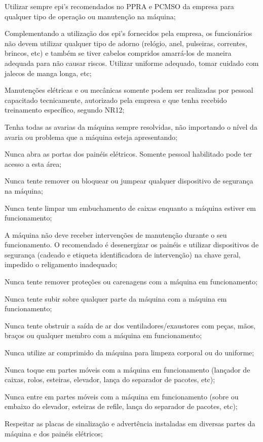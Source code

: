 \begin{generalSafetyRules}
    \item Utilizar sempre epi's recomendados no PPRA e PCMSO da empresa para qualquer tipo de operação ou
manutenção na máquina;
    \item  Complementando a utilização dos epi's fornecidos pela empresa, os funcionários não devem utilizar
qualquer tipo de adorno (relógio, anel, pulseiras, correntes, brincos, etc) e também se tiver cabelos compridos
amarrá-los de maneira adequada para não causar riscos. Utilizar uniforme adequado, tomar cuidado com jalecos
de manga longa, etc;
    \item Manutenções elétricas e ou mecânicas somente podem ser realizadas por pessoal capacitado
tecnicamente, autorizado pela empresa e que tenha recebido treinamento específico, segundo NR12;
    \item Tenha todas as avarias da máquina sempre resolvidas, não importando o nível da avaria ou problema que a
máquina esteja apresentando;
    \item Nunca abra as portas dos painéis elétricos. Somente pessoal habilitado pode ter acesso a esta área;
    \item Nunca tente remover ou bloquear ou jumpear qualquer dispositivo de segurança na máquina;
    \item Nunca tente limpar um embuchamento de caixas enquanto a máquina estiver em funcionamento;
    \item A máquina não deve receber intervenções de manutenção durante o seu funcionamento. O recomendado é
desenergizar os painéis e utilizar dispositivos de segurança (cadeado e etiqueta identificadora de intervenção) na
chave geral, impedido o religamento inadequado;
    \item Nunca tente remover proteções ou carenagens com a máquina em funcionamento;
    \item Nunca tente subir sobre qualquer parte da máquina com a máquina em funcionamento;
    \item Nunca tente obstruir a saída de ar dos ventiladores/exaustores com peças, mãos, braços ou qualquer
membro com a máquina em funcionamento;
    \item Nunca utilize ar comprimido da máquina para limpeza corporal ou do uniforme;
    \item Nunca toque em partes móveis com a máquina em funcionamento (lançador de caixas, rolos, esteiras,
elevador, lança do separador de pacotes, etc);
    \item Nunca entre em partes móveis com a máquina em funcionamento (sobre ou embaixo do elevador, esteiras
de refile, lança do separador de pacotes, etc);
    \item Respeitar as placas de sinalização e advertência instaladas em diversas partes da máquina e dos painéis
elétricos;

\vspace*{\fill}

\newpage
\thispagestyle{fancy}
\vspace*{\fill}


\end{generalSafetyRules}
